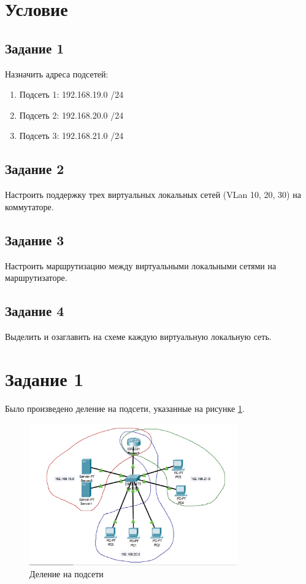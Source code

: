 \section{Условие}

\subsection{Задание 1}

Назначить адреса подсетей:

\begin{enumerate}
    \item Подсеть 1: 192.168.19.0 /24
    \item Подсеть 2: 192.168.20.0 /24
    \item Подсеть 3: 192.168.21.0 /24
\end{enumerate}

\subsection{Задание 2}

Настроить поддержку трех виртуальных локальных сетей (VLan 10, 20, 30) на коммутаторе.

\subsection{Задание 3}

Настроить маршрутизацию между виртуальными локальными сетями на маршрутизаторе.

\subsection{Задание 4}

Выделить и озаглавить на схеме каждую виртуальную локальную сеть.

\section{Задание 1}

Было произведено деление на подсети, указанные на рисунке \ref{fig:subnet}.

\begin{figure}[H]
    \centering
    \includegraphics[width=0.8\textwidth]{img/content/stand.png}
    \caption{Деление на подсети}
    \label{fig:subnet}
\end{figure}

